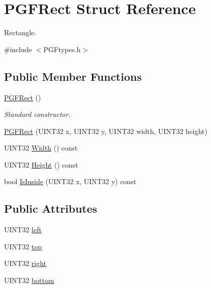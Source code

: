 \hypertarget{structPGFRect}{}\section{P\+G\+F\+Rect Struct Reference}
\label{structPGFRect}


Rectangle.  




{\ttfamily \#include $<$P\+G\+Ftypes.\+h$>$}

\subsection*{Public Member Functions}
\begin{DoxyCompactItemize}
\item 
\mbox{\hyperlink{structPGFRect_a5f161a099003b7ffb7d06fd295682c59}{P\+G\+F\+Rect}} ()
\begin{DoxyCompactList}\small\item\em Standard constructor. \end{DoxyCompactList}\item 
\mbox{\hyperlink{structPGFRect_abf81fef0acecca448c6f9f1b1c44f186}{P\+G\+F\+Rect}} (U\+I\+N\+T32 x, U\+I\+N\+T32 y, U\+I\+N\+T32 width, U\+I\+N\+T32 height)
\item 
U\+I\+N\+T32 \mbox{\hyperlink{structPGFRect_a70d366f5adc104f7037b627f35a18729}{Width}} () const
\item 
U\+I\+N\+T32 \mbox{\hyperlink{structPGFRect_a139b8bb60ea476cd14856476b2d37b0f}{Height}} () const
\item 
bool \mbox{\hyperlink{structPGFRect_a3bf955a2a3e56756776391ed71d1de80}{Is\+Inside}} (U\+I\+N\+T32 x, U\+I\+N\+T32 y) const
\end{DoxyCompactItemize}
\subsection*{Public Attributes}
\begin{DoxyCompactItemize}
\item 
U\+I\+N\+T32 \mbox{\hyperlink{structPGFRect_ac3472e1dc20bc4b1584058376fd7b989}{left}}
\item 
U\+I\+N\+T32 \mbox{\hyperlink{structPGFRect_a79df6810b4ffbf8c8825a67733d56913}{top}}
\item 
U\+I\+N\+T32 \mbox{\hyperlink{structPGFRect_a9174d8de6b9018e0c4ef8e29a501b10a}{right}}
\item 
U\+I\+N\+T32 \mbox{\hyperlink{structPGFRect_a7dc57925fee73fb4b3a1e3744971f579}{bottom}}
\end{DoxyCompactItemize}


